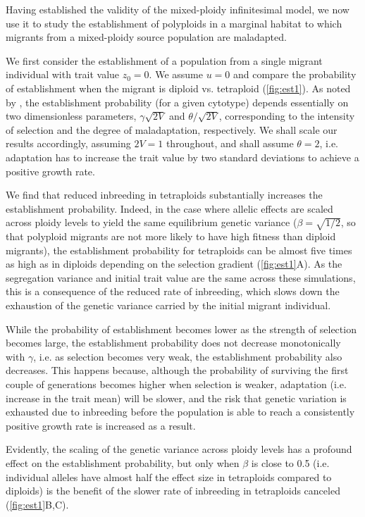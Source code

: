 \documentclass[12pt,a4paper]{article}
\begin{document}
Having established the validity of the mixed-ploidy infinitesimal model, we now
use it to study the establishment of polyploids in a marginal habitat to which
migrants from a mixed-ploidy source population are maladapted.

We first consider the establishment of a population from a single migrant
individual with trait value $z_0 = 0$.
We assume $u=0$ and compare the probability of establishment when the migrant
is diploid vs. tetraploid (\cref{fig:est1}).
As noted by \cite{barton2018}, the establishment probability (for a given
cytotype) depends essentially on two dimensionless parameters,
$\gamma\sqrt{2V}$ and $\theta/\sqrt{2V}$, corresponding to the intensity of
selection and the degree of maladaptation, respectively.
We shall scale our results accordingly, assuming $2V=1$ throughout, and shall
assume $\theta=2$, i.e. adaptation has to increase the trait value by two
standard deviations to achieve a positive growth rate.

We find that reduced inbreeding in tetraploids substantially increases the
establishment probability.
Indeed, in the case where allelic effects are scaled across ploidy levels
to yield the same equilibrium genetic variance ($\beta = \sqrt{1/2}$, so that
polyploid migrants are not more likely to have high fitness than diploid
migrants), the establishment probability for tetraploids can be almost five
times as high as in diploids depending on the selection gradient
(\cref{fig:est1}A).
As the segregation variance and initial trait value are the same across these
simulations, this is a consequence of the reduced rate of inbreeding, which
slows down the exhaustion of the genetic variance carried by the initial
migrant individual.

While the probability of establishment becomes lower as the strength of
selection becomes large, the establishment probability does not decrease
monotonically with $\gamma$, i.e. as selection becomes very weak, the
establishment probability also decreases.
This happens because, although the probability of surviving the first couple of
generations becomes higher when selection is weaker, adaptation (i.e. increase
in the trait mean) will be slower,
and the risk that genetic variation is exhausted due to inbreeding before the
population is able to reach a consistently positive growth rate is increased as
a result.

Evidently, the scaling of the genetic variance across ploidy levels has a
profound effect on the establishment probability, but only when $\beta$ is
close to 0.5 (i.e. individual alleles have almost half the effect size in
tetraploids compared to diploids) is the benefit of the slower rate of
inbreeding in tetraploids canceled (\cref{fig:est1}B,C).
\end{document}
